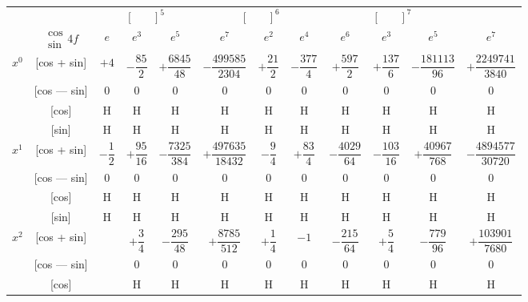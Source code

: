 \documentclass[11pt,a4paper]{book}
\begin{document}
{{%
\newpage
{}

\begin{center}
\small
\begin{tabular}{|c|c|c|c|c|c|c|c|c|c|c|c|}
\hline
& & \multicolumn{3}{c|}{$[\phantom{()}]^5$} & \multicolumn{3}{c|}{$[\phantom{()}]^6$} & \multicolumn{3}{c|}{$[\phantom{()}]^7$} \\
\cline{3-11}
& $\begin{smallmatrix} \cos \\ \sin \end{smallmatrix} 4f$ & $e$ & $e^3$ & $e^5$ & $e^7$ & $e^2$ & $e^4$ & $e^6$ & $e^3$ & $e^5$ & $e^7$ \\
\hline
\multirow{4}{*}{$x^0$} & [cos + sin] & $+4$ & $-\dfrac{85}{2}$ & $+\dfrac{6845}{48}$ & $-\dfrac{499585}{2304}$ & $+\dfrac{21}{2}$ & $-\dfrac{377}{4}$ & $+\dfrac{597}{2}$ & $+\dfrac{137}{6}$ & $-\dfrac{181113}{96}$ & $+\dfrac{2249741}{3840}$ \\
& [cos --- sin] & $0$ & $0$ & $0$ & $0$ & $0$ & $0$ & $0$ & $0$ & $0$ & $0$ \\
& [cos] & H & H & H & H & H & H & H & H & H & H \\
& [sin] & H & H & H & H & H & H & H & H & H & H \\
\hline
\multirow{4}{*}{$x^1$} & [cos + sin] & $-\dfrac{1}{2}$ & $+\dfrac{95}{16}$ & $-\dfrac{7325}{384}$ & $+\dfrac{497635}{18432}$ & $-\dfrac{9}{4}$ & $+\dfrac{83}{4}$ & $-\dfrac{4029}{64}$ & $-\dfrac{103}{16}$ & $+\dfrac{40967}{768}$ & $-\dfrac{4894577}{30720}$ \\
& [cos --- sin] & $0$ & $0$ & $0$ & $0$ & $0$ & $0$ & $0$ & $0$ & $0$ & $0$ \\
& [cos] & H & H & H & H & H & H & H & H & H & H \\
& [sin] & H & H & H & H & H & H & H & H & H & H \\
\hline
\multirow{4}{*}{$x^2$} & [cos + sin] & & $+\dfrac{3}{4}$ & $-\dfrac{295}{48}$ & $+\dfrac{8785}{512}$ & $+\dfrac{1}{4}$ & $-1$ & $-\dfrac{215}{64}$ & $+\dfrac{5}{4}$ & $-\dfrac{779}{96}$ & $+\dfrac{103901}{7680}$ \\
& [cos --- sin] & & $0$ & $0$ & $0$ & $0$ & $0$ & $0$ & $0$ & $0$ & $0$ \\
& [cos] & & H & H & H & H & H & H & H & H & H \\

\end{tabular}
\end{center}}}
\end{document}
